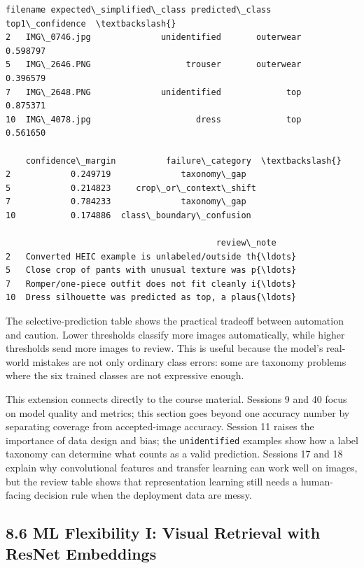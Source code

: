 \documentclass[11pt]{article}
\begin{document}
    \begin{Verbatim}[commandchars=\\\{\}]
        filename expected\_simplified\_class predicted\_class  top1\_confidence  \textbackslash{}
2   IMG\_0746.jpg              unidentified       outerwear         0.598797   
5   IMG\_2646.PNG                   trouser       outerwear         0.396579   
7   IMG\_2648.PNG              unidentified             top         0.875371   
10  IMG\_4078.jpg                     dress             top         0.561650   

    confidence\_margin          failure\_category  \textbackslash{}
2            0.249719              taxonomy\_gap   
5            0.214823     crop\_or\_context\_shift   
7            0.784233              taxonomy\_gap   
10           0.174886  class\_boundary\_confusion   

                                          review\_note  
2   Converted HEIC example is unlabeled/outside th{\ldots}  
5   Close crop of pants with unusual texture was p{\ldots}  
7   Romper/one-piece outfit does not fit cleanly i{\ldots}  
10  Dress silhouette was predicted as top, a plaus{\ldots}  
    \end{Verbatim}

    
    The selective-prediction table shows the practical tradeoff between
automation and caution. Lower thresholds classify more images
automatically, while higher thresholds send more images to review. This
is useful because the model's real-world mistakes are not only ordinary
class errors: some are taxonomy problems where the six trained classes
are not expressive enough.

This extension connects directly to the course material. Sessions 9 and
40 focus on model quality and metrics; this section goes beyond one
accuracy number by separating coverage from accepted-image accuracy.
Session 11 raises the importance of data design and bias; the
\texttt{unidentified} examples show how a label taxonomy can determine
what counts as a valid prediction. Sessions 17 and 18 explain why
convolutional features and transfer learning can work well on images,
but the review table shows that representation learning still needs a
human-facing decision rule when the deployment data are messy.

    \subsection{8.6 ML Flexibility I: Visual Retrieval with ResNet
Embeddings}\label{ml-flexibility-i-visual-retrieval-with-resnet-embeddings}
\end{document}
